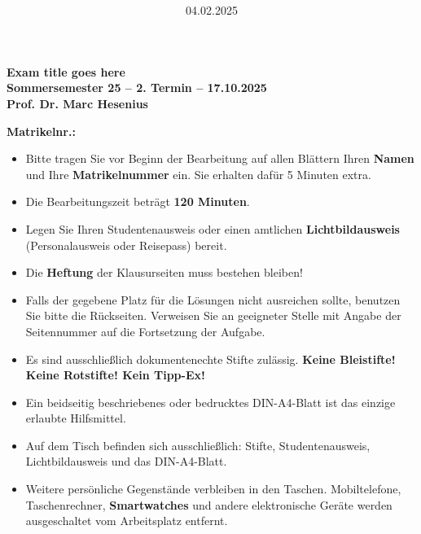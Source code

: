 \documentclass[a4paper,12pt]{article}
\title{\textbf{\runninghead}}
\author{}
\date{04.02.2025}
\begin{document}
\thispagestyle{empty} %
\begin{center}
    \textbf{\LARGE Exam title goes here} \\
    \vspace{0.5cm}
    \textbf{Sommersemester 25 -- 2. Termin -- 17.10.2025} \\
    \vspace{0.2cm}
    \textbf{Prof. Dr. Marc Hesenius}
\end{center}

\vspace{0.5cm}
\noindent
\textbf{Matrikelnr.:} \underline{\hspace{8cm}} \\

\begin{itemize}
    \item Bitte tragen Sie vor Beginn der Bearbeitung auf allen Blättern Ihren \textbf{Namen} und Ihre \textbf{Matrikelnummer} ein. Sie erhalten dafür 5 Minuten extra.
    \item Die Bearbeitungszeit beträgt \textbf{120 Minuten}.
    \item Legen Sie Ihren Studentenausweis oder einen amtlichen \textbf{Lichtbildausweis} (Personalausweis oder Reisepass) bereit.
    \item Die \textbf{Heftung} der Klausurseiten muss bestehen bleiben!
    \item Falls der gegebene Platz für die Lösungen nicht ausreichen sollte, benutzen Sie bitte die Rückseiten. Verweisen Sie an geeigneter Stelle mit Angabe der Seitennummer auf die Fortsetzung der Aufgabe.
    \item Es sind ausschließlich dokumentenechte Stifte zulässig. \textbf{Keine Bleistifte! Keine Rotstifte! Kein Tipp-Ex!}
    \item Ein beidseitig beschriebenes oder bedrucktes DIN-A4-Blatt ist das einzige erlaubte Hilfsmittel. 
    \item Auf dem Tisch befinden sich ausschließlich: Stifte, Studentenausweis, Lichtbildausweis und das DIN-A4-Blatt.
    \item Weitere persönliche Gegenstände verbleiben in den Taschen. Mobiltelefone, Taschenrechner, \textbf{Smartwatches} und andere elektronische Geräte werden ausgeschaltet vom Arbeitsplatz entfernt.
\end{itemize}
\end{document}
